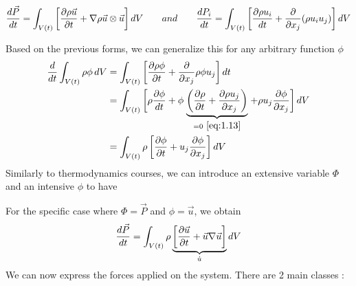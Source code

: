 	\begin{center}
	\begin{equation}
		\frac{d\vec{P}}{dt} = \int _{V(t)} \left[\frac{\D \rho \vec{u}}{\D t} + \nabla \rho \vec{u} \otimes \vec{u} \right] dV \qquad and \qquad \frac{dP_i}{dt} = \int _{V(t)} \left[ \frac{\D \rho u_i}{dt} + \frac{\D}{\D x_j} (\rho u_i u_j) \right] dV
	\end{equation}
	\end{center}
	
	Based on the previous forms, we can generalize this for any arbitrary function $\phi$
	\begin{equation}
	\begin{aligned}
		\frac{d}{dt} \int _{V(t)} \rho \phi\, dV  &= \int _{V(t)} \left[\frac{\D \rho \phi}{\D t} + \frac{\D}{\D x_j} \rho \phi u_j \right] dt \\
		&= \int _{V(t)} \left[ \rho \frac{\D \phi}{dt} + \phi \right. \underbrace{\left( \frac{\D \rho}{\D t} + \frac{\D \rho u_j}{\D x_j} \right)}_{= 0\ \eqref{eq:1.13}}\left. + \rho u_j\frac{\D \phi}{\D x_j} \right] dV \\
		&= \int _{V(t)} \rho \left[ \frac{\D \phi}{\D t} + u_j \frac{\D \phi}{\D x_j} \right] dV
	\end{aligned}
	\end{equation}
	Similarly to thermodynamics courses, we can introduce an extensive variable $\Phi$ and an intensive $\phi$ to have 
	\begin{center}
	\end{center}
	For the specific case where $\Phi = \vec{P}$ and $\phi = \vec{u}$, we obtain
	\begin{equation}
		\frac{d\vec{P}}{dt} = \int _{V(t)} \rho \underbrace{\left[ \frac{\D \vec{u}}{\D t} + \vec{u} \nabla \vec{u} \right]}_{\dot{u}} dV 
		\label{eq:1.24}
	\end{equation}
	We can now express the forces applied on the system. There are 2 main classes : \\
